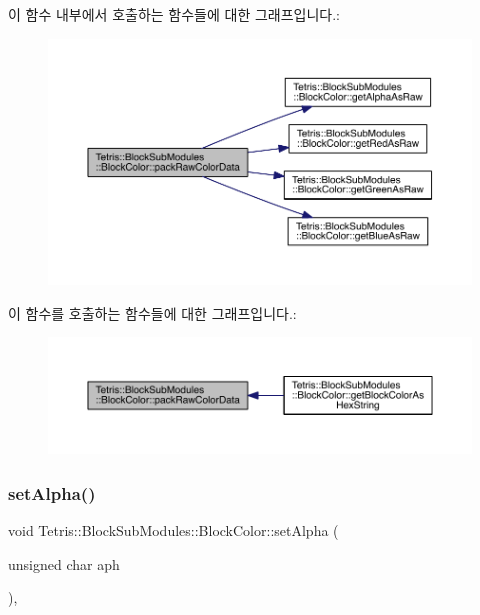 이 함수 내부에서 호출하는 함수들에 대한 그래프입니다.\+:
\nopagebreak
\begin{figure}[H]
\begin{center}
\leavevmode
\includegraphics[width=350pt]{class_tetris_1_1_block_sub_modules_1_1_block_color_a849ebbb0e900c5efdcb99784767e7a7a_cgraph}
\end{center}
\end{figure}
이 함수를 호출하는 함수들에 대한 그래프입니다.\+:
\nopagebreak
\begin{figure}[H]
\begin{center}
\leavevmode
\includegraphics[width=350pt]{class_tetris_1_1_block_sub_modules_1_1_block_color_a849ebbb0e900c5efdcb99784767e7a7a_icgraph}
\end{center}
\end{figure}
\mbox{\label{class_tetris_1_1_block_sub_modules_1_1_block_color_a5fdd2d1a53d92ec0bcc1c25748b890e0}} 
\subsubsection{\texorpdfstring{set\+Alpha()}{setAlpha()}}
{\footnotesize\ttfamily void Tetris\+::\+Block\+Sub\+Modules\+::\+Block\+Color\+::set\+Alpha (\begin{DoxyParamCaption}\item[{unsigned char}]{aph }\end{DoxyParamCaption})\hspace{0.3cm}{\ttfamily [inline]}, {\ttfamily [protected]}}



